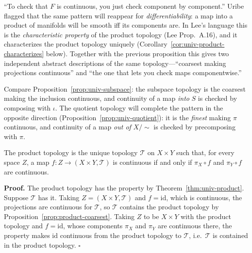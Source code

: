 \documentclass[11pt]{report}
\makeatletter
\newcounter{thmcounter}[section]
\renewenvironment{proof}[1][Proof]{\noindent\textbf{#1.} }{\hfill$\square$\par\vspace{5pt}}
\newcommand{\thmlabel}[1]{\edef\@currentlabel{\arabic{section}.\arabic{thmcounter}}\label{#1}}
\newcommand{\leeref}[1]{\par\smallskip{\raggedleft\footnotesize\textsc{Lee}:\ #1\par}}
\makeatother
\begin{document}
\begin{rembox}\label{rem:why-universal-property-matters}
``To check that $F$ is continuous, you just check component by component.'' Uribe flagged that the same pattern will reappear for \emph{differentiability}: a map into a product of manifolds will be smooth iff its components are. In Lee's language this is the \emph{characteristic property} of the product topology (Lee Prop.\ A.16), and it characterizes the product topology uniquely (Corollary~\ref{cor:univ-product-characterizes} below). Together with the previous proposition this gives two independent abstract descriptions of the same topology---``coarsest making projections continuous'' and ``the one that lets you check maps componentwise.''

Compare Proposition~\ref{prop:univ-subspace}: the subspace topology is the coarsest making the inclusion continuous, and continuity of a map \emph{into} $S$ is checked by composing with $\iota$. The quotient topology will complete the pattern in the opposite direction (Proposition~\ref{prop:univ-quotient}): it is the \emph{finest} making $\pi$ continuous, and continuity of a map \emph{out of} $X/{\sim}$ is checked by precomposing with $\pi$.
\end{rembox}

\begin{corbox}\thmlabel{cor:univ-product-characterizes}
The product topology is the unique topology $\mathcal{T}$ on $X \times Y$ such that, for every space $Z$, a map $f : Z \to (X \times Y, \mathcal{T})$ is continuous if and only if $\pi_X \circ f$ and $\pi_Y \circ f$ are continuous.
\leeref{Proposition A.23(b)}
\end{corbox}

\begin{proof}
The product topology has the property by Theorem~\ref{thm:univ-product}. Suppose $\mathcal{T}$ has it. Taking $Z = (X \times Y, \mathcal{T})$ and $f = \mathrm{id}$, which is continuous, the projections are continuous for $\mathcal{T}$, so $\mathcal{T}$ contains the product topology by Proposition~\ref{prop:product-coarsest}. Taking $Z$ to be $X \times Y$ with the product topology and $f = \mathrm{id}$, whose components $\pi_X$ and $\pi_Y$ are continuous there, the property makes $\mathrm{id}$ continuous from the product topology to $\mathcal{T}$, i.e.\ $\mathcal{T}$ is contained in the product topology.
\end{proof}
\end{document}

